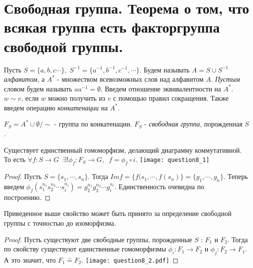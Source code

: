 \section{Свободная группа. Теорема о том, что всякая группа есть факторгруппа свободной группы.}

Пусть $ S = \{ a, b, c \cdots \}, \; S^{-1} = \{ a^{-1}, b^{-1}, c^{-1}, \cdots \} $. 
Будем называть $ A = S \cup S^{-1} $ \emph{алфавитом}, а $ A^{*} $ - множеством всевозможных слов над алфавитом $ A $.
\emph{Пустым} словом будем называть $ aa^{-1} = \emptyset $. Введем отношение эквивалентности на $ A^{*} $. $ w \sim v $, если 
$ w $ можно получить из $ v $ с помощью правил сокращения. Также введем операцию \emph{конкатенации} на $ A^{*} $.

\begin{defn}
  $ F_{S} = A^{*} \cup \emptyset /\!\!\!\sim $ - группа по конкатенации. 
  $ F_{S} $ - \emph{свободная группа}, порожденная $ S $.
\end{defn}

\begin{thm}
  Существует единственный гомоморфизм, делающий диаграмму коммутативной. 
  То есть $ \forall f : S \rightarrow G \;\; \exists ! \phi_{f} : F_{S} \rightarrow G, \;\; f = \phi_{f} \circ i $. \newline
  \texttt{[image: question8\_1]}
\end{thm}
\begin{proof}
  Пусть $ S = \{ s_{1}, \cdots, s_{n} \} $. Тогда $ Im f = \{ f(s_{1}, \cdots, f(s_{n}) \} = \{ g_{1}, \cdots, g_{n} \} $. Теперь
  введем $ \phi_{f}(s_{1}^{n_{1}}s_{2}^{n_{2}}\cdots s_{i}^{n_{i}}) = g_{2}^{n_{1}}g_{2}^{n_{2}}\cdots g_{i}^{n_{i}} $. Единственность
  очевидна по построению.
\end{proof}

\begin{thm}
  Приведенное выше свойство может быть принято за определение свободной группы с точностью до изоморфизма.
\end{thm}
\begin{proof}
  Пусть существуют две свободные группы, порожденные $ S $ : $ F_{1} $ и $ F_{2} $. Тогда по свойству
  существуют единственные гомоморфизмы $ \phi_{i} : F_{1} \rightarrow F_{2} $ и $ \phi_{j} : F_{2} \rightarrow F_{1} $. А это значит, что
  $ F_{1} \overset\sim{=} F_{2} $. \newline
  \texttt{[image: question8\_2.pdf]}
\end{proof}

